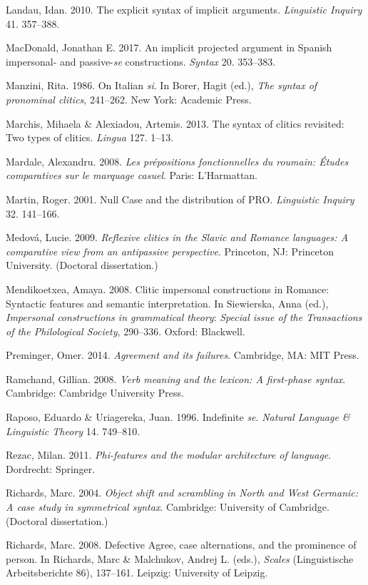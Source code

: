 \documentclass[output=paper]{langsci/langscibook}
\begin{document}
Landau, Idan. 2010. The explicit syntax of implicit arguments. \textit{Linguistic Inquiry} 41. 357–388.

MacDonald, Jonathan E. 2017. An implicit projected argument in Spanish impersonal- and passive-\textit{se} constructions. \textit{Syntax} 20. 353–383.

Manzini, Rita. 1986. On Italian \textit{si}. In Borer, Hagit (ed.), \textit{The syntax of pronominal clitics}, 241–262. New York: Academic Press.

Marchis, Mihaela \& Alexiadou, Artemis. 2013. The syntax of clitics revisited: Two types of clitics. \textit{Lingua} 127. 1–13.

Mardale, Alexandru. 2008. \textit{Les prépositions fonctionnelles du roumain: Études comparatives sur le marquage casuel}. Paris: L’Harmattan.

Martin, Roger. 2001. Null Case and the distribution of PRO. \textit{Linguistic Inquiry} 32. 141–166.

Medová, Lucie. 2009. \textit{Reflexive clitics in the Slavic and Romance languages: A comparative view from an antipassive perspective}. Princeton, NJ: Princeton University. (Doctoral dissertation.)

Mendikoetxea, Amaya. 2008. Clitic impersonal constructions in Romance: Syntactic features and semantic interpretation. In Siewierska, Anna (ed.), \textit{Impersonal constructions in grammatical theory}: \textit{Special issue of the Transactions of the Philological Society}, 290–336. Oxford: Blackwell.

Preminger, Omer. 2014. \textit{Agreement and its failures}. Cambridge, MA: MIT Press.

Ramchand, Gillian. 2008. \textit{Verb meaning and the lexicon: A first-phase syntax}. Cambridge: Cambridge University Press.

Raposo, Eduardo \& Uriagereka, Juan. 1996. Indefinite \textit{se}. \textit{Natural Language \& Linguistic Theory} 14. 749–810.

Rezac, Milan. 2011. \textit{Phi-features and the modular architecture of language}. Dordrecht: Springer.

Richards, Marc. 2004. \textit{Object shift and scrambling in North and West Germanic: A case study in symmetrical syntax}. Cambridge: University of Cambridge. (Doctoral dissertation.)

Richards, Marc. 2008. Defective Agree, case alternations, and the prominence of person. In Richards, Marc \& Malchukov, Andrej L. (eds.), \textit{Scales} (Linguistische Arbeitsberichte 86), 137–161. Leipzig: University of Leipzig.
\end{document}
